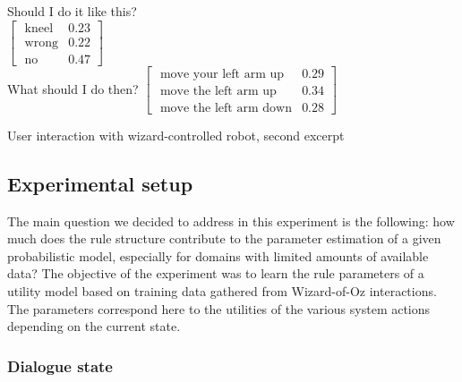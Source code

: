 \begin{Transcript}[p!]
\begin{dialogue}
 \vspace{3mm}
 Should I do it like this? \\
 $\begin{bmatrix}\text{ kneel} & 0.23 \\
\text{ wrong} & 0.22 \\
\text{ no} & 0.47 \end{bmatrix}$ \vspace{3mm} \\
 \vspace{2mm}
 What should I do then?  \vspace{3mm}
 $\begin{bmatrix}\text{ move your left arm up} & 0.29 \\
\text{ move the left arm up} & 0.34 \\
\text{ move the left arm down} & 0.28 \end{bmatrix}$ \vspace{3mm} \\
\end{dialogue}
\vspace{-4mm} \hspace{1cm}  \vspace{3mm}
\caption{User interaction with wizard-controlled robot, second excerpt}
\end{Transcript}

\subsection{Experimental setup}
\label{sec:wozlearning-experiments-setup}

The main question we decided to address in this experiment is the following: how much does the rule structure contribute to the parameter estimation of a given probabilistic model, especially for domains with limited amounts of available data?  The objective of the experiment was to learn the rule parameters of a utility model based on training data gathered from Wizard-of-Oz interactions. The parameters correspond here to the utilities of the various system actions depending on the current state.


\subsubsection*{Dialogue state}

